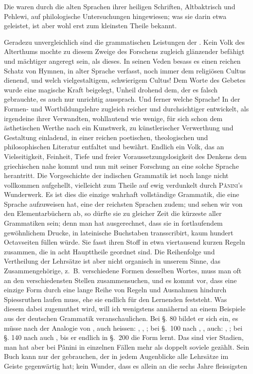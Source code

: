 \label{I.IV.parsi}
Die  waren durch die alten Sprachen ihrer heiligen Schriften, Altbaktrisch und Pehlewi, auf philologische Untersuchungen hingewiesen; was sie darin etwa geleistet, ist aber wohl erst zum kleinsten Theile bekannt.

\label{I.IV.inder}
Geradezu unvergleichlich sind die grammatischen Leistungen der . Kein Volk des Alterthums mochte zu diesem Zweige des Forschens zugleich glänzender befähigt und mächtiger angeregt sein, als dieses. In seinen Veden besass es einen reichen Schatz von Hymnen, in alter Sprache verfasst, noch immer dem religiösen Cultus dienend, und welch vielgestaltigem, schwierigem Cultus! Dem Worte des Gebetes wurde eine magische Kraft beigelegt, Unheil drohend dem, der es falsch gebrauchte, es auch nur unrichtig aussprach. Und ferner welche Sprache! In der Formen- und Wortbildungslehre zugleich reicher und durchsichtiger entwickelt, als irgendeine ihrer Verwandten, wohllautend wie wenige, für sich schon dem ästhetischen Werthe nach ein Kunstwerk, zu künstlerischer Verwerthung und Gestaltung einladend, in einer reichen poetischen, theologischen und philosophischen Literatur entfaltet und bewährt. Endlich ein Volk, das an Vielseitigkeit, Feinheit, Tiefe \label{fp.22} und freier Voraussetzungslosigkeit des Denkens dem griechischen nahe kommt und nun mit seiner Forschung an eine solche Sprache herantritt. Die Vorgeschichte der indischen Grammatik ist noch lange nicht vollkommen aufgehellt, vielleicht zum Theile auf ewig verdunkelt durch \textsc{Pânini}’s Wunderwerk. Es ist dies die einzige wahrhaft vollständige Grammatik, die eine Sprache aufzuweisen hat, eine der reichsten Sprachen zudem; und sehen wir von den Elementarbüchern ab, so dürfte sie zu gleicher Zeit die kürzeste aller Grammatiken sein; denn man hat ausgerechnet, dass sie in fortlaufendem gewöhnlichem Drucke, in lateinische Buchstaben \label{sp.23} transscribirt, kaum hundert Octavseiten füllen würde. Sie fasst ihren Stoff in etwa viertausend kurzen Regeln zusammen, die in acht Haupttheile geordnet sind. Die Reihenfolge und Vertheilung der Lehrsätze ist aber nicht organisch in unserem Sinne, das Zusammengehörige, z.~B. verschiedene Formen desselben Wortes, muss man oft an den verschiedensten Stellen zusammensuchen, und es kommt vor, dass eine einzige Form durch eine lange Reihe von Regeln und Ausnahmen hindurch Spiessruth\-en laufen muss, ehe sie endlich für den Lernenden feststeht. Was diesem dabei zugemuthet wird, will ich wenigstens annähernd an einem Beispiele aus der deutschen Grammatik veranschaulichen. Bei §. 80 bildet er sich ein, es müsse nach der Analogie von ,  auch heissen: , , ; bei \mbox{§. 100} nach , , auch: , ; bei §. 140 nach  auch , bis er endlich in §.~200 die Form  lernt. Das sind vier Stadien, man hat aber bei Pânini in einzelnen Fällen mehr als doppelt soviele gezählt. Sein Buch kann nur der gebrauchen, der in jedem Augenblicke alle Lehrsätze im Geiste gegenwärtig hat; kein Wunder, dass es allein an die sechs Jahre fleissigsten 
